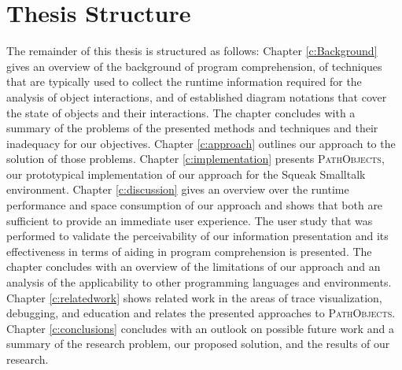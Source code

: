 \section{Thesis Structure}
The remainder of this thesis is structured as follows:
Chapter \ref{c:Background} gives an overview of the background of program comprehension, of techniques that are typically used to collect the runtime information required for the analysis of object interactions, and of established diagram notations that cover the state of objects and their interactions.
The chapter concludes with a summary of the problems of the presented methods and techniques and their inadequacy for our objectives.
Chapter \ref{c:approach} outlines our approach to the solution of those problems.
Chapter \ref{c:implementation} presents \textsc{PathObjects}, our prototypical implementation of our approach for the Squeak Smalltalk environment.
Chapter \ref{c:discussion} gives an overview over the runtime performance and space consumption of our approach and shows that both are sufficient to provide an immediate user experience.
The user study that was performed to validate the perceivability of our information presentation and its effectiveness in terms of aiding in program comprehension is presented.
The chapter concludes with an overview of the limitations of our approach and an analysis of the applicability to other programming languages and environments.
Chapter \ref{c:relatedwork} shows related work in the areas of trace visualization, debugging, and education and relates the presented approaches to \textsc{PathObjects}.
Chapter \ref{c:conclusions} concludes with an outlook on possible future work and a summary of the research problem, our proposed solution, and the results of our research.